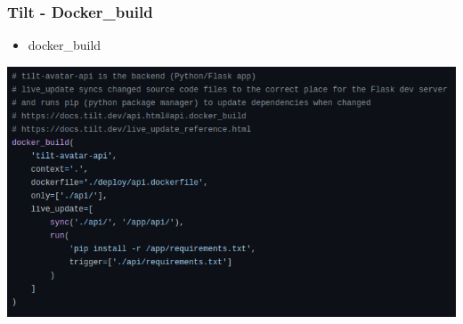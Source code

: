 \subsubsection{Tilt - Docker\_build}
\begin{frame}[fragile]{\subsubsecname}
  \begin{itemize}
    \item  docker\_build
  \end{itemize}
  \includegraphics[width=1\linewidth]{assets/tilt-func-build-docker.png}
\end{frame}
